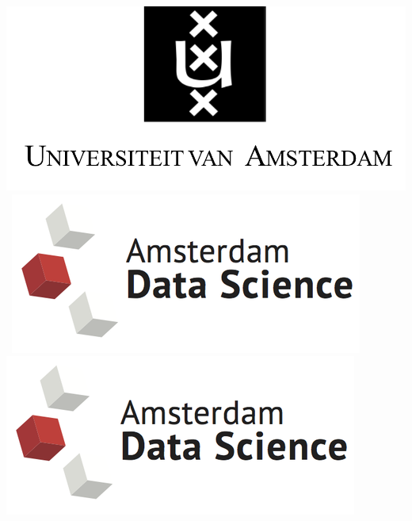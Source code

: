 \begin{titlepage}
\begin{center}
\mbox{\includegraphics[width=.2\paperwidth]{TitlePages/logos/logo-uva.png} 
\includegraphics[width=.2\paperwidth]{TitlePages/logos/ads.png}
\includegraphics[width=.2\paperwidth]{TitlePages/logos/ads.png} %
}
\end{center}
\end{titlepage}

%
%
%

